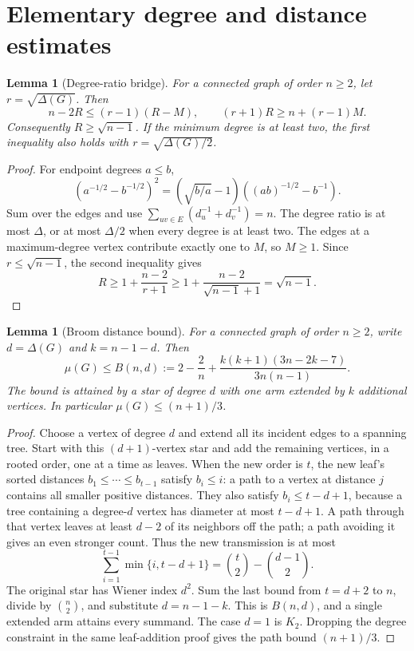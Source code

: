 \documentclass[11pt,a4paper]{article}
\newtheorem{lemma}[theorem]{Lemma}
\theoremstyle{remark}
\numberwithin{equation}{section}
\begin{document}
\section{Elementary degree and distance estimates}

\begin{lemma}[Degree-ratio bridge]\label{lem:new-bridge}
For a connected graph of order $n\ge2$, let $r=\sqrt{\Delta(G)}$. Then
\[
 n-2R\le(r-1)(R-M),\qquad
 (r+1)R\ge n+(r-1)M.
\]
Consequently $R\ge\sqrt{n-1}$. If the minimum degree is at least two,
the first inequality also holds with $r=\sqrt{\Delta(G)/2}$.
\end{lemma}
\begin{proof}
For endpoint degrees $a\le b$,
\[
 (a^{-1/2}-b^{-1/2})^2
 =(\sqrt{b/a}-1)((ab)^{-1/2}-b^{-1}).
\]
Sum over the edges and use
$\sum_{uv\in E}(d_u^{-1}+d_v^{-1})=n$.
The degree ratio is at most $\Delta$, or at most $\Delta/2$
when every degree is at least two.
The edges at a maximum-degree vertex contribute exactly one to $M$,
so $M\ge1$. Since $r\le\sqrt{n-1}$, the second inequality gives
\[
 R\ge1+\frac{n-2}{r+1}
 \ge1+\frac{n-2}{\sqrt{n-1}+1}=\sqrt{n-1}.
\]
\end{proof}

\begin{lemma}[Broom distance bound]\label{lem:new-broom}
For a connected graph of order $n\ge2$, write $d=\Delta(G)$ and
$k=n-1-d$. Then
\[
 \mu(G)\le B(n,d):=
 2-\frac2n+\frac{k(k+1)(3n-2k-7)}{3n(n-1)}.
\]
The bound is attained by a star of degree $d$ with one arm extended
by $k$ additional vertices. In particular
$\mu(G)\le(n+1)/3$.
\end{lemma}
\begin{proof}
Choose a vertex of degree $d$ and extend all its incident edges to a
spanning tree. Start with this $(d+1)$-vertex star and add the remaining
vertices, in a rooted order, one at a time as leaves. When the new order
is $t$, the new leaf's sorted distances $b_1\le\cdots\le b_{t-1}$
satisfy $b_i\le i$: a path to a vertex at distance $j$ contains all
smaller positive distances. They also satisfy $b_i\le t-d+1$,
because a tree containing a degree-$d$ vertex has diameter at most
$t-d+1$. A path through that vertex leaves at least $d-2$ of its
neighbors off the path; a path avoiding it gives an even stronger count.
Thus the new transmission is at most
\[
 \sum_{i=1}^{t-1}\min\{i,t-d+1\}
 =\binom t2-\binom{d-1}{2}.
\]
The original star has Wiener index $d^2$. Sum the last bound from
$t=d+2$ to $n$, divide by $\binom n2$, and substitute $d=n-1-k$.
This is $B(n,d)$, and a single extended arm attains every summand.
The case $d=1$ is $K_2$. Dropping the degree constraint in the same
leaf-addition proof gives the path bound $(n+1)/3$.
\end{proof}
\end{document}
